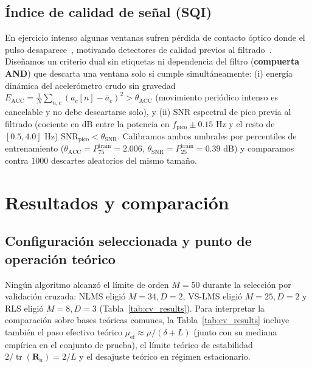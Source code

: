 \documentclass[conference]{IEEEtran}
\newcommand{\secUC}[1]{#1}
\newcommand{\secUC}[1]{\texorpdfstring{\MakeUppercase{#1}}{#1}}
\begin{document}
\subsection{Índice de calidad de señal (SQI)}
\label{sec:sqi_metodo}

En ejercicio intenso algunas ventanas sufren pérdida de contacto óptico donde el pulso desaparece~\cite{zhang2015troika}, motivando detectores de calidad previos al filtrado~\cite{krishnan2010twostage,elgendi2016sqi}. Diseñamos un criterio dual sin etiquetas ni dependencia del filtro (\textbf{compuerta AND}) que descarta una ventana solo si cumple simultáneamente: (i) energía dinámica del acelerómetro crudo sin gravedad $E_{\text{ACC}}=\frac{1}{N}\sum_{n,c}(a_c[n]-\bar{a}_c)^2 > \theta_{\text{ACC}}$ (movimiento periódico intenso es cancelable y no debe descartarse solo), y (ii) SNR espectral de pico previa al filtrado (cociente en dB entre la potencia en $f_{\text{pico}}\pm 0.15\text{ Hz}$ y el resto de $[0.5,4.0]\text{ Hz}$) $\text{SNR}_{\text{pico}}<\theta_{\text{SNR}}$. Calibramos ambos umbrales por percentiles de entrenamiento ($\theta_{\text{ACC}}=P_{75}^{\text{train}}=2.006$, $\theta_{\text{SNR}}=P_{25}^{\text{train}}=0.39\text{ dB}$) y comparamos contra $1000$ descartes aleatorios del mismo tamaño.

\section{\secUC{Resultados y comparación}}
\label{sec:res}

\subsection{Configuración seleccionada y punto de operación teórico}
\label{sec:res_cv}

Ningún algoritmo alcanzó el límite de orden $M=50$ durante la selección por validación cruzada: NLMS eligió $M=34, D=2$, VS-LMS eligió $M=25, D=2$ y RLS eligió $M=8, D=3$ (Tabla~\ref{tab:cv_results}). Para interpretar la comparación sobre bases teóricas comunes, la Tabla~\ref{tab:cv_results} incluye también el paso efectivo teórico $\mu_{\text{ef}}\approx\mu/(\delta+L)$ (junto con su mediana empírica en el conjunto de prueba), el límite teórico de estabilidad $2/\operatorname{tr}(\mathbf{R}_a)=2/L$ y el desajuste teórico en régimen estacionario.
\end{document}

